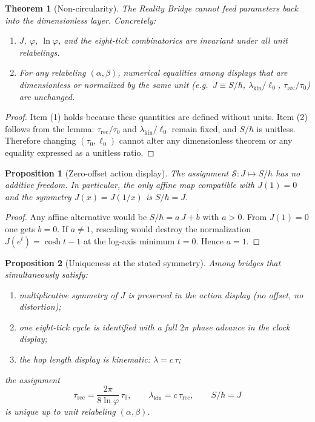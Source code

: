 \documentclass[11pt]{article}
\theoremstyle{plain}
\newtheorem{theorem}{Theorem}
\newtheorem{proposition}{Proposition}
\theoremstyle{definition}
\theoremstyle{remark}
\begin{document}
\begin{theorem}[Non-circularity]
The Reality Bridge cannot feed parameters back into the dimensionless layer. Concretely:
\begin{enumerate}
\item \(J\), \(\varphi\), \(\ln\varphi\), and the eight-tick combinatorics are invariant under all unit relabelings.
\item For any relabeling \((\alpha,\beta)\), numerical equalities among displays that are dimensionless or normalized by the same unit (e.g.\ \(J\equiv S/\hbar\), \(\lambda_{\mathrm{kin}}/\ell_{0}\), \(\tau_{\mathrm{rec}}/\tau_{0}\)) are unchanged.
\end{enumerate}
\end{theorem}

\begin{proof}
Item (1) holds because these quantities are defined without units. Item (2) follows from the lemma: \(\tau_{\mathrm{rec}}/\tau_{0}\) and \(\lambda_{\mathrm{kin}}/\ell_{0}\) remain fixed, and \(S/\hbar\) is unitless. Therefore changing \((\tau_{0},\ell_{0})\) cannot alter any dimensionless theorem or any equality expressed as a unitless ratio.
\end{proof}

\begin{proposition}[Zero-offset action display]
The assignment \(\mathcal{S}:J\mapsto S/\hbar\) has no additive freedom. In particular, the only affine map compatible with \(J(1)=0\) and the symmetry \(J(x)=J(1/x)\) is \(S/\hbar=J\).
\end{proposition}

\begin{proof}
Any affine alternative would be \(S/\hbar=a\,J+b\) with \(a>0\). From \(J(1)=0\) one gets \(b=0\). If \(a\neq 1\), rescaling would destroy the normalization \(J(e^{t})=\cosh t-1\) at the log-axis minimum \(t=0\). Hence \(a=1\).
\end{proof}

\begin{proposition}[Uniqueness at the stated symmetry]
Among bridges that simultaneously satisfy:
\begin{enumerate}
\item multiplicative symmetry of \(J\) is preserved in the action display (no offset, no distortion);
\item one eight-tick cycle is identified with a full \(2\pi\) phase advance in the clock display;
\item the hop length display is kinematic: \(\lambda = c\,\tau\);
\end{enumerate}
the assignment
\[
\tau_{\mathrm{rec}}=\frac{2\pi}{8\ln\varphi}\,\tau_{0},\qquad
\lambda_{\mathrm{kin}}=c\,\tau_{\mathrm{rec}},\qquad
S/\hbar=J
\]
is unique up to unit relabeling \((\alpha,\beta)\).
\end{proposition}
\end{document}
